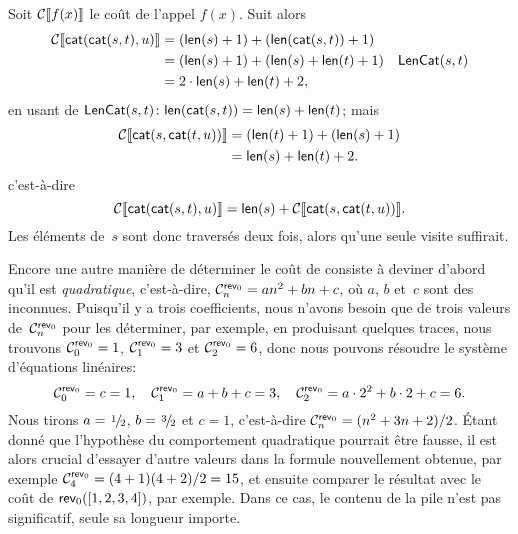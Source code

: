 Soit \(\Call{f(x)}\) le coût de l'appel \(f(x)\). Suit
alors
\begin{align*}
\Call{\fun{cat}(\fun{cat}(s,t),u)}
  &= (\fun{len}(s) + 1) + (\fun{len}(\fun{cat}(s,t)) + 1)\\
  &= (\fun{len}(s) + 1) + (\fun{len}(s) + \fun{len}(t) + 1)
  & \IH{\pred{LenCat}{s,t}}\\
  &= 2 \cdot \fun{len}(s) + \fun{len}(t) + 2,
\end{align*}
en usant de \(\pred{LenCat}{s,t} \colon \fun{len}(\fun{cat}(s,t)) =
\fun{len}(s) + \fun{len}(t)\); mais
\begin{align*}
  \Call{\fun{cat}(s,\fun{cat}(t,u))}
  &= (\fun{len}(t) + 1) + (\fun{len}(s) + 1)\\
  &= \fun{len}(s) + \fun{len}(t) + 2.
\end{align*}
c'est-à-dire
\begin{equation}
\Call{\fun{cat}(\fun{cat}(s,t),u)} = \fun{len}(s) +
\Call{\fun{cat}(s,\fun{cat}(t,u))}.
\label{ineq:cat_assoc}
\end{equation}
Les éléments de~\(s\) sont donc traversés deux fois, alors qu'une
seule visite suffirait.

Encore une autre manière de déterminer le coût de 
consiste à deviner d'abord qu'il est
\emph{quadratique}, c'est-à-dire,
\(\C{\fun{rev}_0}{n} = an^2 + bn +
c\), où \(a\), \(b\) et~\(c\) sont
des inconnues. Puisqu'il y a trois coefficients, nous n'avons besoin
que de trois valeurs de~\(\C{\fun{rev}_0}{n}\) pour les déterminer,
par exemple, en produisant quelques traces, nous trouvons
\(\C{\fun{rev}_0}{0} = 1\), \(\C{\fun{rev}_0}{1} = 3\) et
\(\C{\fun{rev}_0}{2} = 6\), donc nous pouvons résoudre le système
d'équations linéaires:
\begin{equation*}
\C{\fun{rev}_0}{0} = c = 1,\quad
\C{\fun{rev}_0}{1} = a + b + c = 3,\quad
\C{\fun{rev}_0}{2} = a \cdot 2^2 + b \cdot 2 + c = 6.
\end{equation*}
Nous tirons \(a = \myfrac1/2\), \(b = \myfrac3/2\) et \(c = 1\),
c'est-à-dire \(\C{\fun{rev}_0}{n} = (n^2 + 3n +
2)/2\). Étant donné que l'hypothèse
du comportement quadratique pourrait être fausse, il est alors crucial
d'essayer d'autre valeurs dans la formule nouvellement obtenue, par
exemple \(\C{\fun{rev}_0}{4} = (4+1)(4+2)/2 = 15\), et ensuite
comparer le résultat avec le coût de
\(\fun{rev}_0([1,2,3,4])\), par
exemple.  Dans ce cas, le contenu de la pile n'est pas significatif,
seule sa longueur importe.

